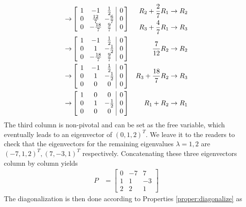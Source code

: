\begin{solution}
\begin{align*}
\to&
\left[\begin{array}{@{\,}wc{10pt}wc{10pt}wc{10pt}|c@{\,}}
1 & -1 & \frac{1}{2} & 0\\
0 & \frac{12}{7} & -\frac{6}{7} & 0\\
0 & -\frac{18}{7} & \frac{9}{7} & 0
\end{array}\right] &
\begin{aligned}
R_2 + \frac{2}{7}R_1 &\to R_2 \\
R_3 + \frac{4}{7}R_1 &\to R_3 \\
\end{aligned} \\
\to&
\left[\begin{array}{@{\,}wc{10pt}wc{10pt}wc{10pt}|c@{\,}}
1 & -1 & \frac{1}{2} & 0\\
0 & 1 & -\frac{1}{2} & 0\\
0 & -\frac{18}{7} & \frac{9}{7} & 0
\end{array}\right] & \frac{7}{12}R_2 \to R_2 \\
\to&
\left[\begin{array}{@{\,}wc{10pt}wc{10pt}wc{10pt}|c@{\,}}
1 & -1 & \frac{1}{2} & 0\\
0 & 1 & -\frac{1}{2} & 0\\
0 & 0 & 0 & 0
\end{array}\right] & R_3 + \frac{18}{7}R_2 \to R_3 \\
\to&
\left[\begin{array}{@{\,}wc{10pt}wc{10pt}wc{10pt}|c@{\,}}
1 & 0 & 0 & 0\\
0 & 1 & -\frac{1}{2} & 0\\
0 & 0 & 0 & 0
\end{array}\right] & R_1 + R_2 \to R_1
\end{align*}
The third column is non-pivotal and can be set as the free variable, which eventually leads to an eigenvector of $(0,1,2)^T$. We leave it to the readers to check that the eigenvectors for the remaining eigenvalues $\lambda = 1,2$ are $(-7,1,2)^T, (7,-3,1)^T$ respectively. Concatenating these three eigenvectors column by column yields
\begin{align*}
P &=
\begin{bmatrix}
0 & -7 & 7\\ 
1 & 1 & -3\\ 
2 & 2 & 1
\end{bmatrix}
\end{align*}
The diagonalization is then done according to Properties \ref{proper:diagonalize} as
\begin{align*}

\end{align*}
\end{solution}
